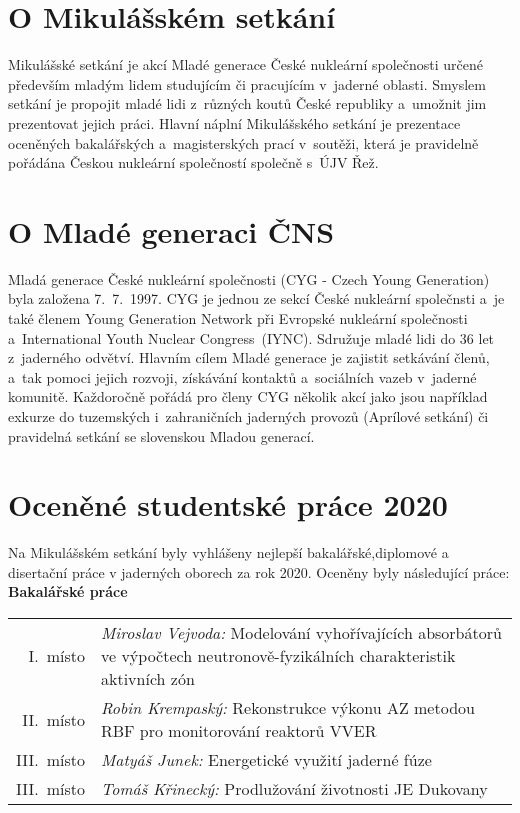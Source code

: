 \documentclass[11pt,oneside]{article}
\newcommand{\oceneny}[3]{
    #1~místo & \textit{#2} #3 \\
}
\begin{document}
\newpage

\pagestyle{patickaSponzoru}

\section{O Mikulášském setkání}
{\normalsize Mikulášské setkání je akcí Mladé generace České nukleární společnosti určené především mladým lidem studujícím či pracujícím v~jaderné oblasti. Smyslem setkání je propojit mladé lidi z~různých koutů České republiky a~umožnit jim prezentovat jejich práci. Hlavní náplní Mikulášského setkání je prezentace oceněných bakalářských a~magisterských prací v~soutěži, která je pravidelně pořádána Českou nukleární společností společně s~ÚJV Řež.}

\vspace{1cm}

\section{O Mladé generaci ČNS}
{\normalsize Mladá generace České nukleární společnosti (CYG - Czech Young Generation) byla založena 7.~7.~1997. CYG je jednou ze sekcí České nukleární společnsti a~je také členem Young Generation Network při Evropské nukleární společnosti a~International Youth Nuclear Congress~(IYNC). Sdružuje mladé lidi do 36 let z~jaderného odvětví. Hlavním cílem Mladé generace je zajistit setkávání členů, a~tak pomoci jejich rozvoji, získávání kontaktů a~sociálních vazeb v~jaderné komunitě. Každoročně pořádá pro členy CYG několik akcí jako jsou například exkurze do tuzemských i~zahraničních jaderných provozů (Aprílové setkání) či pravidelná setkání se slovenskou Mladou generací.}


\newpage
\section{Oceněné studentské práce 2020}
{\normalsize Na Mikulášském setkání byly vyhlášeny nejlepší bakalářské,diplomové a disertační práce v jaderných oborech za rok 2020. Oceněny byly následující práce:}\\

\noindent\textbf{\large{Bakalářské práce}}
\begin{table}[h]
    \begin{tabular}{r p{}}
        \oceneny{I.}{Miroslav Vejvoda:}{Modelování vyhořívajících absorbátorů ve výpočtech neutronově-fyzikálních charakteristik aktivních zón}
        \oceneny{II.}{Robin Krempaský:}{Rekonstrukce výkonu AZ metodou RBF pro monitorování reaktorů VVER}
        \oceneny{III.}{Matyáš Junek:}{Energetické využití jaderné fúze}
        \oceneny{III.}{Tomáš Křinecký:}{Prodlužování životnosti JE Dukovany}
    \end{tabular}
\end{table}  
\end{document}
